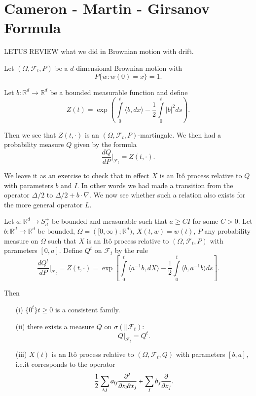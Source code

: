 \chapter{Cameron - Martin - Girsanov Formula}\label{chap29}

LET\pageoriginale US REVIEW what we did in Brownian motion with drift. 

Let $(\Omega,\mathscr{F}_{t},P)$ be a $d$-dimensional Brownian motion
with
$$ 
P\{w:w(0)=x\}=1.
$$

Let $b:\mathbb{R}^{d}\to \mathbb{R}^{d}$ be a bounded measurable
function and define
$$
Z(t)=\exp\left(\int\limits^{t}_{0}\langle b,dx\rangle
-\frac{1}{2}\int\limits^{t}_{0}|b|^{2}ds\right).
$$

Then we see that $Z(t,\cdot)$ is an
$(\Omega,\mathscr{F}_{t},P)$-martingale. We then had a probability
measure $Q$ given by the formula
$$
\frac{dQ}{dP}\Big|_{\mathscr{F}_{t}}=Z(t,\cdot).
$$

We leave it as an exercise to check that in effect $X$ is an It\^o
process relative to $Q$ with parameters $b$ and $I$. In other words we
had made a transition from the operator $\Delta/2$ to $\Delta/2+b\cdot
\nabla$. We now see whether such a relation also exists for the more
general operator $L$.

\begin{theorem*}
Let $a:\mathbb{R}^{d}\to S^{+}_{d}$ be bounded and measurable such
that $a\geq CI$ for some $C>0$. Let $b:\mathbb{R}^{d}\to
\mathbb{R}^{d}$ be bounded, $\Omega=([0,\infty);\mathbb{R}^{d})$,
  $X(t,w)=w(t)$, $P$ any probability measure on $\Omega$ such that $X$
  is an It\^o process relative to $(\Omega,\mathscr{F}_{t},P)$ with
  parameters $[0,a]$. Define $Q^{t}$ on $\mathscr{F}_{t}$ by the rule
$$
\frac{dQ^{t}}{dP}\Big|_{\mathscr{F}_{t}}=Z(t,\cdot)=\exp\left[\int\limits^{t}_{0}\langle
  a^{-1}b,dX\rangle -\frac{1}{2}\int\limits^{t}_{0}\langle
  b,a^{-1}b\rangle ds\right].
$$\pageoriginale

Then
\begin{itemize}
\item[\rm(i)] $\{0^{t}\}t\geq 0$ is a consistent family.

\item[\rm(ii)] there exists a measure $Q$ on
  $\sigma(||\mathscr{F}_{t})$:
$$
Q\Big|_{\mathscr{F}_{t}}=Q^{t}.
$$

\item[\rm(iii)] $X(t)$ is an It\^o process relative to
  $(\Omega,\mathscr{F}_{t},Q)$ with parameters $[b,a]$, i.e.\@ it
  corresponds to the operator
$$
\frac{1}{2}\sum\limits_{i,j}a_{ij}\frac{\partial^{2}}{\partial x_{i}\partial
  x_{j}}+\sum_{j}b_{j}\frac{\partial}{\partial x_{j}}.
$$
\end{itemize}
\end{theorem*}

